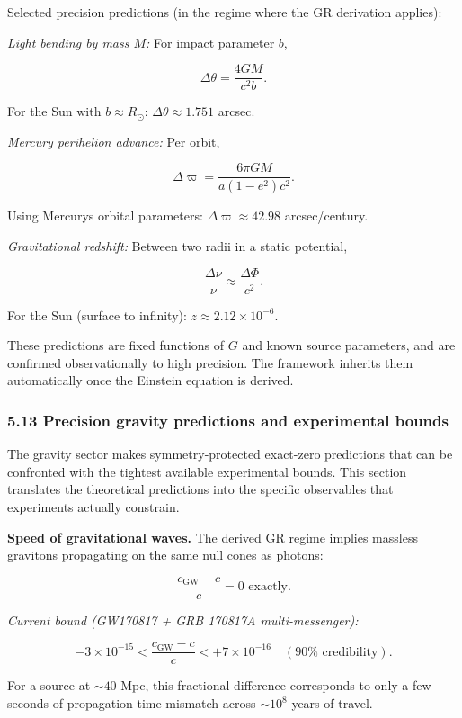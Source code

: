 Selected precision predictions (in the regime where the GR derivation applies):

\emph{Light bending by mass \(M\):} For impact parameter \(b\),

\[
\Delta\theta = \frac{4GM}{c^2 b}.
\]

For the Sun with \(b \approx R_\odot\): \(\Delta\theta \approx 1.751\) arcsec.

\emph{Mercury perihelion advance:} Per orbit,

\[
\Delta\varpi = \frac{6\pi GM}{a(1-e^2)c^2}.
\]

Using Mercury\textquotesingle s orbital parameters: \(\Delta\varpi \approx 42.98\) arcsec/century.

\emph{Gravitational redshift:} Between two radii in a static potential,

\[
\frac{\Delta\nu}{\nu} \approx \frac{\Delta\Phi}{c^2}.
\]

For the Sun (surface to infinity): \(z \approx 2.12 \times 10^{-6}\).

These predictions are fixed functions of \(G\) and known source parameters, and are confirmed observationally to high precision. The framework inherits them automatically once the Einstein equation is derived.

\subsubsection{5.13 Precision gravity predictions and experimental bounds}\label{513-precision-gravity-predictions-and-experimental-bounds}

The gravity sector makes symmetry-protected exact-zero predictions that can be confronted with the tightest available experimental bounds. This section translates the theoretical predictions into the specific observables that experiments actually constrain.

\textbf{Speed of gravitational waves.} The derived GR regime implies massless gravitons propagating on the same null cones as photons:

\[
\frac{c_{\mathrm{GW}} - c}{c} = 0 \text{ exactly.}
\]

\emph{Current bound (GW170817 + GRB 170817A multi-messenger):}

\[
-3 \times 10^{-15} < \frac{c_{\mathrm{GW}} - c}{c} < +7 \times 10^{-16}
\quad (90\% \text{ credibility}).
\]

For a source at \(\sim 40\) Mpc, this fractional difference corresponds to only a few seconds of propagation-time mismatch across \(\sim 10^8\) years of travel.

